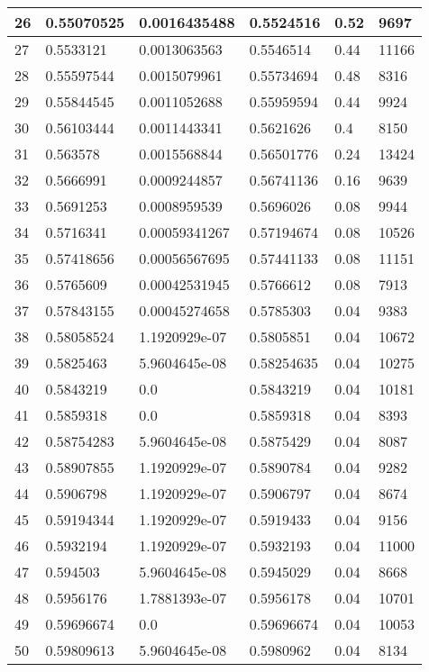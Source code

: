 \begin{longtable}{|l|l|l|l|l|l|}
26 & 0.55070525 & 0.0016435488 & 0.5524516 & 0.52 & 9697 \\ \hline 
27 & 0.5533121 & 0.0013063563 & 0.5546514 & 0.44 & 11166 \\ \hline 
28 & 0.55597544 & 0.0015079961 & 0.55734694 & 0.48 & 8316 \\ \hline 
29 & 0.55844545 & 0.0011052688 & 0.55959594 & 0.44 & 9924 \\ \hline 
30 & 0.56103444 & 0.0011443341 & 0.5621626 & 0.4 & 8150 \\ \hline 
31 & 0.563578 & 0.0015568844 & 0.56501776 & 0.24 & 13424 \\ \hline 
32 & 0.5666991 & 0.0009244857 & 0.56741136 & 0.16 & 9639 \\ \hline 
33 & 0.5691253 & 0.0008959539 & 0.5696026 & 0.08 & 9944 \\ \hline 
34 & 0.5716341 & 0.00059341267 & 0.57194674 & 0.08 & 10526 \\ \hline 
35 & 0.57418656 & 0.00056567695 & 0.57441133 & 0.08 & 11151 \\ \hline 
36 & 0.5765609 & 0.00042531945 & 0.5766612 & 0.08 & 7913 \\ \hline 
37 & 0.57843155 & 0.00045274658 & 0.5785303 & 0.04 & 9383 \\ \hline 
38 & 0.58058524 & 1.1920929e-07 & 0.5805851 & 0.04 & 10672 \\ \hline 
39 & 0.5825463 & 5.9604645e-08 & 0.58254635 & 0.04 & 10275 \\ \hline 
40 & 0.5843219 & 0.0 & 0.5843219 & 0.04 & 10181 \\ \hline 
41 & 0.5859318 & 0.0 & 0.5859318 & 0.04 & 8393 \\ \hline 
42 & 0.58754283 & 5.9604645e-08 & 0.5875429 & 0.04 & 8087 \\ \hline 
43 & 0.58907855 & 1.1920929e-07 & 0.5890784 & 0.04 & 9282 \\ \hline 
44 & 0.5906798 & 1.1920929e-07 & 0.5906797 & 0.04 & 8674 \\ \hline 
45 & 0.59194344 & 1.1920929e-07 & 0.5919433 & 0.04 & 9156 \\ \hline 
46 & 0.5932194 & 1.1920929e-07 & 0.5932193 & 0.04 & 11000 \\ \hline 
47 & 0.594503 & 5.9604645e-08 & 0.5945029 & 0.04 & 8668 \\ \hline 
48 & 0.5956176 & 1.7881393e-07 & 0.5956178 & 0.04 & 10701 \\ \hline 
49 & 0.59696674 & 0.0 & 0.59696674 & 0.04 & 10053 \\ \hline 
50 & 0.59809613 & 5.9604645e-08 & 0.5980962 & 0.04 & 8134 \\ \hline 

\end{longtable}
